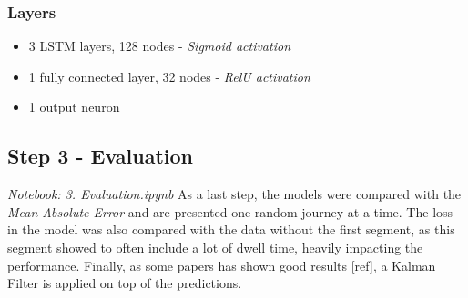 \subsubsection{Layers}

\begin{itemize}
    \item 3 LSTM layers, 128 nodes - \textit{Sigmoid activation}
    \item 1 fully connected layer, 32 nodes - \textit{RelU activation}
    \item 1 output neuron
\end{itemize}


\subsection{Step 3 - Evaluation}
\textit{Notebook: 3. Evaluation.ipynb}
\newline
As a last step, the models were compared with the \textit{Mean Absolute Error} and are presented one random journey at a time. The loss in the model was also compared with the data without the first segment, as this segment showed to often include a lot of dwell time, heavily impacting the performance. Finally, as some papers has shown good results [ref], a Kalman Filter is applied on top of the predictions.

